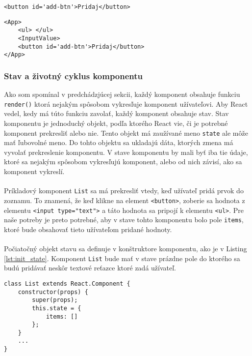 \begin{lstlisting}[caption={Vytvorenie elementu pomocou JSX}, label={lst:jsx_element_creation}]
<button id='add-btn'>Pridaj</button>
\end{lstlisting}

\begin{lstlisting}[caption={Vytvorenie komponentu pomocou JSX}, label={lst:jsx_component_creation}]
<App>
	<ul> </ul>
	<InputValue>
	<button id='add-btn'>Pridaj</button>
</App>
\end{lstlisting}




\subsubsection{Stav a  životný cyklus komponentu}
Ako som spomínal v predchádzjúcej sekcii, každý komponent obsahuje funkciu \texttt{render()} ktorá nejakým spôsobom vykresľuje komponent užívateľovi. Aby React vedel, kedy má túto funkciu zavolať, každý komponent obsahuje stav.  Stav komponentu je jednoduchý objekt, podľa ktorého React vie, či je potrebné komponent prekresliť alebo nie. Tento objekt má zaužívané meno \texttt{state} ale môže mať ľubovolné meno. Do tohto objektu sa ukladajú dáta, ktorých zmena má vyvolať prekreslenie komponentu. V stave komponentu by mali byť iba tie údaje, ktoré sa nejakým spôsobom vykresľujú komponent, alebo od nich závisí, ako sa komponent vykreslí. 

\paragraph{}
Príkladový komponent \texttt{List} sa má prekresliť vtedy, keď užívateľ pridá prvok do zoznamu. To znamená, že keď klikne na element \texttt{<button>}, zoberie sa hodnota z elementu \texttt{<input type="text">} a táto hodnota sa pripojí k elementu \texttt{<ul>}. Pre naše potreby je preto potrebné, aby v stave tohto komponentu bolo pole \texttt{items}, ktoré bude obsahovať tieto užívateľom pridané hodnoty.

\paragraph{}
Počiatočný objekt stavu sa definuje v konštruktore komponentu, ako je v Listing \ref{lst:init_state}. Komponent \texttt{List} bude mať v stave prázdne pole do ktorého sa budú pridávať neskôr textové reťazce ktoré zadá užívateľ.

\begin{lstlisting}[caption={Definovanie stavu v konštruktore komponentu},label={lst:init_state}]
class List extends React.Component {
	constructor(props) {
		super(props);
		this.state = {
			items: []
		};
	}
	...
}
\end{lstlisting}

